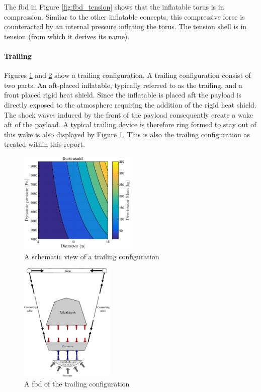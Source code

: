 The \gls{fbd} in Figure  \ref{fig:fbd_tension} shows that the inflatable torus is in compression. Similar to the other inflatable concepts, this compressive force is counteracted by an internal pressure inflating the torus. The tension shell is in tension (from which it derives its name). 

\paragraph{Trailing}

Figures \ref{fig:conc_trailing} and \ref{fig:fbd_trailing} show a trailing configuration. A trailing configuration consist of two parts. An aft-placed inflatable, typically referred to as the trailing, and a front placed rigid heat shield. Since the inflatable is placed aft the payload is directly exposed to the atmosphere requiring the addition of the rigid heat shield. The shock waves induced by the front of the payload consequently create a wake aft of the payload. A typical trailing device is therefore ring formed to stay out of this wake is also displayed by Figure  \ref{fig:conc_trailing}. This is also the trailing configuration as treated within this report.

\begin{figure}[H]
\centering
\includegraphics[width = 0.5\textwidth]{Figure/ISO_comp.eps}
\caption{A schematic view of a trailing configuration}
\label{fig:conc_trailing}
\end{figure}

\begin{figure}[H]
\centering
\includegraphics[width = 0.4\textwidth]{Figure/FBD_trailing.eps}
\caption{A \gls{fbd} of the trailing configuration}
\label{fig:fbd_trailing}
\end{figure}

